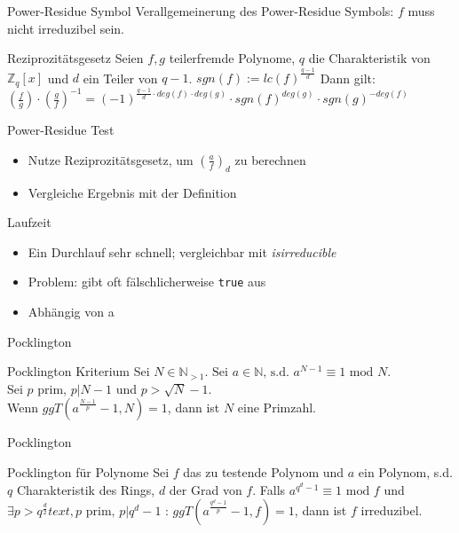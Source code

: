 \documentclass[german,10pt,xcolor=colortbl,compress]{beamer}%
\newcommand{\ZZ}{\mathbb{Z}}
\newcommand{\NN}{\mathbb{N}}
\begin{document}
	
	\begin{frame}{Power-Residue Symbol}
		Verallgemeinerung des Power-Residue Symbols: $f$ muss nicht irreduzibel sein.
		
		\begin{block}{Reziprozitätsgesetz}
			Seien $f,g$ teilerfremde Polynome, $q$ die Charakteristik von $\ZZ_q[x]$ und $d$ ein Teiler von $q-1$.
			$sgn(f):=lc(f)^{\frac{q-1}{d}}$ 
			Dann gilt:
			$\left(\frac{f}{g}\right) \cdot \left(\frac{g}{f}\right)^{-1} = (-1)^{\frac{q-1}{d} \cdot deg(f)\cdot deg(g)}\cdot sgn(f)^{deg(g)} \cdot sgn(g)^{-deg(f)} $
							
		\end{block}
	\end{frame}

	
	\begin{frame}{Power-Residue Test}
		\begin{itemize}
		\item Nutze Reziprozitätsgesetz, um $(\frac{a}{f})_d $ zu berechnen
		\item Vergleiche Ergebnis mit der Definition
		\end{itemize}
	\end{frame}

	
	\begin{frame}{Laufzeit}
		\begin{itemize}
			\item Ein Durchlauf sehr schnell; vergleichbar mit \textit{isirreducible}
			\item Problem: gibt oft fälschlicherweise \texttt{true} aus
			\item Abhängig von a
		\end{itemize}
	\end{frame}

	
	\begin{frame}{Pocklington}
		\begin{block}{Pocklington Kriterium}
			Sei $N\in \NN_{>1}$. $%
			\text{Sei } a \in \NN \text{, s.d. } a^{N-1} \equiv 1 \text{ mod } N$.\\
			Sei $p$ prim, $p | N-1$ und $p> \sqrt{N}-1$.\\
			Wenn $ggT(a^{\frac{N-1}{p}}-1,N) = 1$, dann ist $N$ eine Primzahl.
		\end{block}
	\end{frame}

		
	\begin{frame}{Pocklington}
		\begin{block}{Pocklington für Polynome}
			Sei $f$ das zu testende Polynom und $a$ ein Polynom, s.d. 
			$q$ Charakteristik des Rings, $d$ der Grad von $f$.
			Falls $a^{q^{d}-1}\equiv 1 \text{ mod }f$ und 
			$\exists p > q^{\frac{d}{2}} text{, } p \text{ prim, } p|q^{d}-1 $ : $ggT(a^{\frac{q^{d}-1}{p}}-1, f)=1$, dann ist $f$ irreduzibel. 
		\end{block}
	
	\end{frame}
\end{document}
